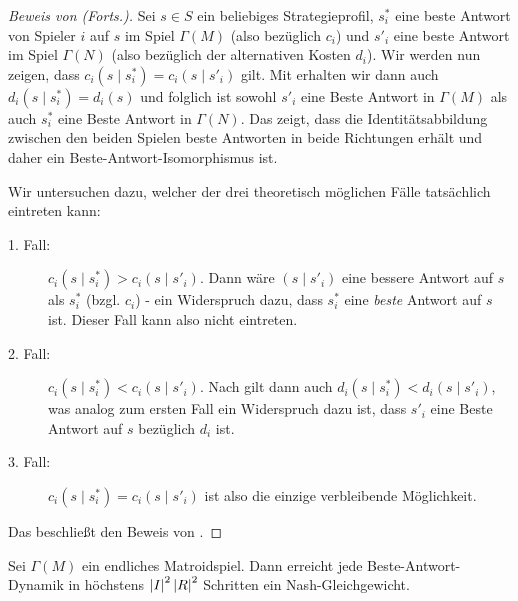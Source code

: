 \begin{proof}[Beweis von  (Forts.)]
	Sei $s \in S$ ein beliebiges Strategieprofil, $s^\ast_i$ eine beste Antwort von Spieler $i$ auf $s$ im Spiel $\Gamma(M)$ (also bezüglich $c_i$) und $s'_i$ eine beste Antwort im Spiel $\Gamma(N)$ (also bezüglich der alternativen Kosten $d_i$). Wir werden nun zeigen, dass $c_i(s \mid s^\ast_i) = c_i(s \mid s'_i)$ gilt. Mit  erhalten wir dann auch $d_i(s \mid s^\ast_i) = d_i(s)$ und folglich ist sowohl $s'_i$ eine Beste Antwort in $\Gamma(M)$ als auch $s^\ast_i$ eine Beste Antwort in $\Gamma(N)$. Das zeigt, dass die Identitätsabbildung zwischen den beiden Spielen beste Antworten in beide Richtungen erhält und daher ein Beste-Antwort-Isomorphismus ist. 
	
	Wir untersuchen dazu, welcher der drei theoretisch möglichen Fälle tatsächlich eintreten kann:
	\begin{description}
		\item[1. Fall:] $c_i(s \mid s^\ast_i) > c_i(s \mid s'_i)$. Dann wäre $(s \mid s'_i)$ eine bessere Antwort auf $s$ als $s^\ast_i$ (bzgl. $c_i$) - ein Widerspruch dazu, dass $s^\ast_i$ eine \emph{beste} Antwort auf $s$ ist. Dieser Fall kann also nicht eintreten.
		\item[2. Fall:] $c_i(s \mid s^\ast_i) < c_i(s \mid s'_i)$. Nach  gilt dann auch $d_i(s \mid s^\ast_i) < d_i(s \mid s'_i)$, was analog zum ersten Fall ein Widerspruch dazu ist, dass $s'_i$ eine Beste Antwort auf $s$ bezüglich $d_i$ ist.
		\item[3. Fall:] $c_i(s \mid s^\ast_i) = c_i(s \mid s'_i)$ ist also die einzige verbleibende Möglichkeit.
	\end{description}
	Das beschließt den Beweis von .
\end{proof}

\begin{kor}\label{kor:BA-DynamikInMatroidSpielen}
	Sei $\Gamma(M)$ ein endliches Matroidspiel. Dann erreicht jede Beste-Antwort-Dynamik in höchstens $\left|I\right|^2\left|R\right|^2$ Schritten ein Nash-Gleichgewicht.
\end{kor}

